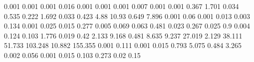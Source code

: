 0.001      0.001      %
0.001      0.016      %
0.001      0.001      %
0.001      0.007      %
0.001      0.001      %
0.367      1.701      %
0.034      0.535      %
0.222      1.692      %
0.033      0.423      %
4.88       10.93      %
0.649      7.896      %
0.001      0.06       %
0.001      0.013      %
0.003      0.134      %
0.001      0.025      %
0.015      0.277      %
0.005      0.069      %
0.063      0.481      %
0.023      0.267      %
0.025      0.9        %
0.004      0.124      %
0.103      1.776      %
0.019      0.42       %
2.133      9.168      %
0.481      8.635      %
9.237      27.019     %
2.129      38.111     %
51.733     103.248    %
10.882     155.355    %
0.001      0.111      %
0.001      0.015      %
0.793      5.075      %
0.484      3.265      %
0.002      0.056      %
0.001      0.015      %
0.103      0.273      %
0.02       0.15       %
